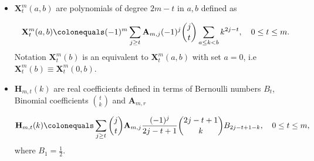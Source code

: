\documentclass[12pt, letterpaper]{amsart}
\theoremstyle{definition}
\theoremstyle{remark}
\newenvironment{myitemize}
{ \begin{itemize}
    \setlength{\itemsep}{4pt}
    \setlength{\parskip}{4pt}
    \setlength{\parsep}{4pt}     }
{ \end{itemize}                  }
\numberwithin{equation}{section}
\begin{document}
\begin{myitemize}
\item $\mathbf{X}^{m}_{t}(a,b)$ are polynomials of degree $2m-t$ in $a,b$ defined as

\begin{equation*}
\mathbf{X}^{m}_{t}(a,b)\colonequals (-1)^m \sum\limits_{j\geq t} \mathbf{A}_{m,j} (-1)^j \binom{j}{t} \sum\limits_{a\leq k<b}k^{2j-t}, \quad 0\leq t\leq m.
\end{equation*}
Notation $\mathbf{X}^{m}_{t}(b)$ is an equivalent to $\mathbf{X}^{m}_{t}(a,b)$ with set $a=0$, i.e $\mathbf{X}^{m}_{t}(b) \equiv \mathbf{X}^{m}_{t}(0,b)$.

\item $\mathbf{H}_{m,t}(k)$ are real coefficients defined in terms of Bernoulli numbers $B_t$, Binomial coefficients $\binom{t}{k}$ and $\mathbf{A}_{m,r}$

\begin{equation*}
\mathbf{H}_{m,t}(k)\colonequals \sum\limits_{j\geq t}\binom{j}{t}\mathbf{A}_{m,j} \frac{(-1)^j}{2j-t+1}\binom{2j-t+1}{k}B_{2j-t+1-k}, \quad 0\leq t\leq m,
\end{equation*}
where $B_1=\tfrac12$.

\end{myitemize}
\end{document}
